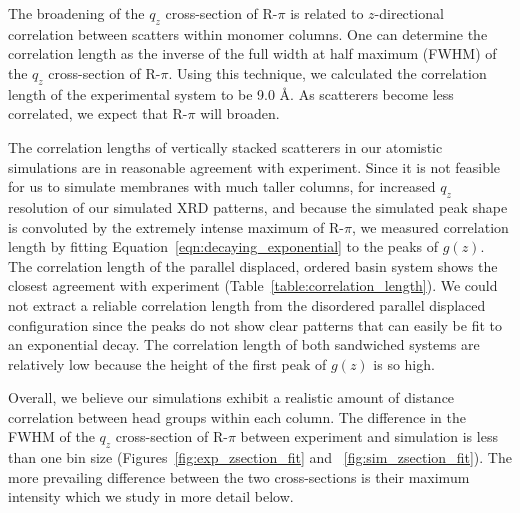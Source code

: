 \documentclass[journal=jpcbfk,manuscript=article]{achemso}
\begin{document}
  The broadening of the $q_z$ cross-section of R-$\pi$ is related to $z$-directional
  correlation between scatters within monomer columns. One can determine the correlation length as the
  inverse of the full width at half maximum (FWHM) of the $q_z$ cross-section of R-$\pi$.
  Using this technique, we calculated the correlation length of the experimental system
  to be 9.0 \AA. As scatterers become less correlated, we expect that R-$\pi$ will broaden.

  The correlation lengths of vertically stacked scatterers in our atomistic simulations
  are in reasonable agreement with experiment. Since it is not feasible for us to
  simulate membranes with much taller columns, for increased $q_z$ resolution of our
  simulated XRD patterns, and because the simulated peak shape is convoluted by the
  extremely intense maximum of R-$\pi$, we measured correlation length by fitting
  Equation~\ref{eqn:decaying_exponential} to the peaks of $g(z)$. The correlation 
  length of the parallel displaced, ordered basin system shows the closest agreement
  with experiment (Table~\ref{table:correlation_length}). 
   We could not extract a reliable correlation
  length from the disordered parallel displaced configuration since the peaks do not show
  clear patterns that can easily be fit to an exponential decay. The correlation length
  of both sandwiched systems are relatively low because the height of the first peak of 
  $g(z)$ is so high. 
  
  Overall, we believe our simulations exhibit a realistic amount of distance correlation
  between head groups within each column. The difference in the FWHM of the $q_z$ 
  cross-section of R-$\pi$ between experiment and simulation is less than one bin size
  (Figures~\ref{fig:exp_zsection_fit} and ~\ref{fig:sim_zsection_fit}). The more 
  prevailing difference between the two cross-sections is their maximum intensity which
  we study in more detail below.
  
\end{document}

